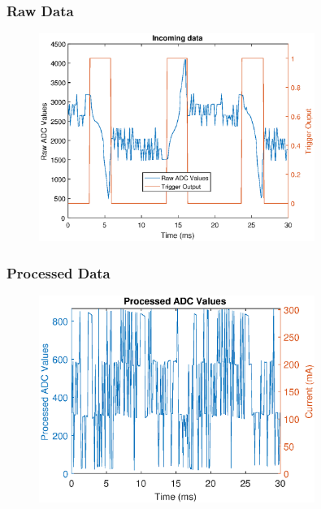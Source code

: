 \documentclass{beamer}
\begin{document}
	\begin{frame}\frametitle{Raw Data}

		\begin{figure}
			\centering
			\includegraphics[width=0.8\textwidth]{ac-raw-data.eps}
		\end{figure}

	\end{frame}





	\begin{frame}\frametitle{Processed Data}

		\begin{figure}
			\centering
			\includegraphics[width=0.8\textwidth]{../chapters/evaluation-chapters/hardware/ac/processed-ac-testbed-adc-data.eps}
		\end{figure}

	\end{frame}
\end{document}

